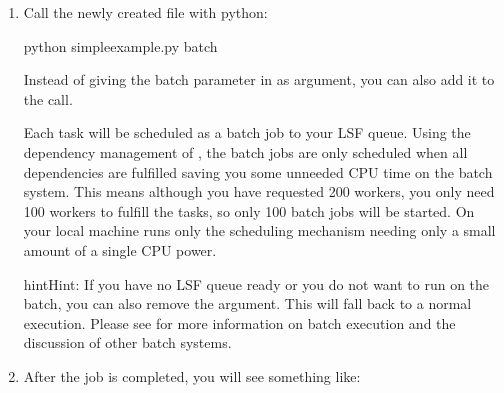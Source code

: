 \documentclass[letterpaper,10pt,english]{sphinxmanual}
\begin{document}
\begin{enumerate}
\item {} 
Call the newly created file with python:

\begin{sphinxVerbatim}[commandchars=\\\{\}]
python simple\PYGZhy{}example.py \PYGZhy{}\PYGZhy{}batch
\end{sphinxVerbatim}

Instead of giving the batch parameter in as argument, you can also add it
to the  call.

Each task will be scheduled as a batch job to your LSF queue.
Using the dependency management of , the batch jobs are only scheduled when all dependencies are fulfilled
saving you some unneeded CPU time on the batch system.
This means although you have requested 200 workers, you only need
100 workers to fulfill the tasks, so only 100 batch jobs will be started.
On your local machine runs only the scheduling mechanism needing only a small amount of a single CPU power.

\begin{sphinxadmonition}{hint}{Hint:}
If you have no LSF queue ready or you do not want to run on the batch,
you can also remove the  argument.
This will fall back to a normal  execution.
Please see {\hyperref[\detokenize{usage/batch:batch-label}]{}} for more information on batch execution
and the discussion of other batch systems.
\end{sphinxadmonition}

\item {} 
After the job is completed, you will see something like:

\begin{sphinxVerbatim}[commandchars=\\\{\}]
    

    
   
      


\end{sphinxVerbatim}
\end{enumerate}
\end{document}
